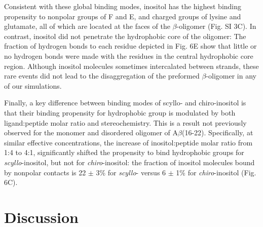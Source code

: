 Consistent with these global binding modes, inositol has the highest binding propensity to nonpolar groups of F and E, and charged groups of lysine and glutamate, all of which are located at the faces of the $\beta$-oligomer (Fig. SI 3C).  In contrast, inositol did not penetrate the hydrophobic core of the oligomer: The fraction of hydrogen bonds to each residue depicted in Fig. 6E show that little or no hydrogen bonds were made with the residues in the central hydrophobic core region. Although inositol molecules sometimes intercalated between strands, these rare events did not lead to the disaggregation of the preformed $\beta$-oligomer in any of our simulations.

Finally, a key difference between binding modes of scyllo- and chiro-inositol is that their binding propensity for hydrophobic group is modulated by both ligand:peptide molar ratio and stereochemistry. This is a result not previously observed for the monomer and disordered oligomer of A$\beta$(16-22). Specifically, at similar effective concentrations, the increase of inositol:peptide molar ratio from 1:4 to 4:1, significantly shifted the propensity to bind hydrophobic groups for \emph{scyllo}-inositol, but not for \emph{chiro}-inositol: the fraction of inositol molecules bound by nonpolar contacts is 22 $\pm$ 3\% for \emph{scyllo}- versus 6 $\pm$ 1\% for \emph{chiro}-inositol (Fig. 6C).



\section{Discussion} %

